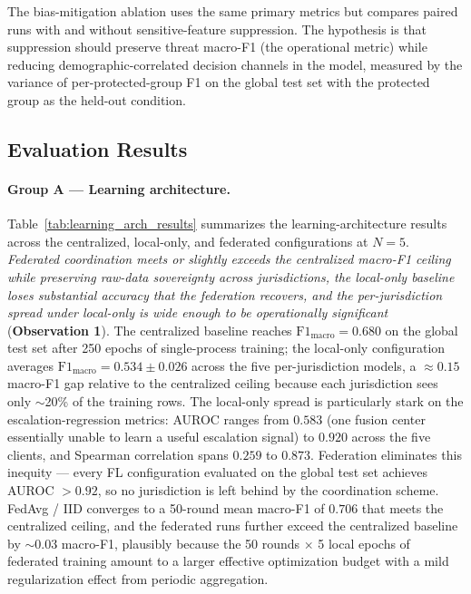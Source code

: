 \documentclass[conference]{IEEEtran}
\begin{document}
The bias-mitigation ablation uses the same primary metrics but compares paired runs with and without sensitive-feature suppression. The hypothesis is that suppression should preserve threat macro-F1 (the operational metric) while reducing demographic-correlated decision channels in the model, measured by the variance of per-protected-group F1 on the global test set with the protected group as the held-out condition.

\subsection{Evaluation Results}

\paragraph{Group A --- Learning architecture.}
Table~\ref{tab:learning_arch_results} summarizes the learning-architecture results across the centralized, local-only, and federated configurations at $N=5$. \textit{Federated coordination meets or slightly exceeds the centralized macro-F1 ceiling while preserving raw-data sovereignty across jurisdictions, the local-only baseline loses substantial accuracy that the federation recovers, and the per-jurisdiction spread under local-only is wide enough to be operationally significant} (\textbf{Observation 1}). The centralized baseline reaches $\mathrm{F1}_{\text{macro}} = 0.680$ on the global test set after 250 epochs of single-process training; the local-only configuration averages $\mathrm{F1}_{\text{macro}} = 0.534 \pm 0.026$ across the five per-jurisdiction models, a $\approx 0.15$ macro-F1 gap relative to the centralized ceiling because each jurisdiction sees only $\sim$20\% of the training rows. The local-only spread is particularly stark on the escalation-regression metrics: AUROC ranges from $0.583$ (one fusion center essentially unable to learn a useful escalation signal) to $0.920$ across the five clients, and Spearman correlation spans $0.259$ to $0.873$. Federation eliminates this inequity --- every FL configuration evaluated on the global test set achieves AUROC $> 0.92$, so no jurisdiction is left behind by the coordination scheme. FedAvg / IID converges to a 50-round mean macro-F1 of $0.706$ that meets the centralized ceiling, and the federated runs further exceed the centralized baseline by $\sim$$0.03$ macro-F1, plausibly because the 50 rounds $\times$ 5 local epochs of federated training amount to a larger effective optimization budget with a mild regularization effect from periodic aggregation.
\end{document}
